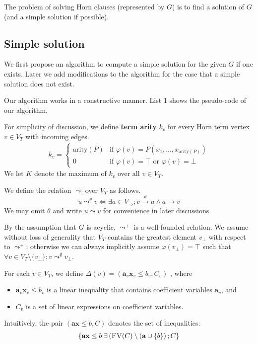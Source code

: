 \documentclass[a4paper,12pt]{article}
\newcommand{\edge}[2]{#1\rightarrow#2}
\newcommand{\edgel}[3]{#1\xrightarrow{#2}#3}
\begin{document}
The problem of solving Horn clauses (represented by $G$) is to find a
solution of $G$ (and a simple solution if possible).

\subsection{Simple solution}

We first propose an algorithm to compute a simple solution for the given
$G$ if one exists. Later we add modifications to the algorithm for the
case that a simple solution does not exist.

Our algorithm works in a constructive manner. List 1 shows the
pseudo-code of our algorithm.

For simplicity of discussion, we define \textbf{term arity} $k_v$ for
every Horn term vertex $v \in V_T$ with incoming edges.
\begin{align*}
k_v =
\begin{cases}
\mathrm{arity}(P) & \mbox{if } \varphi(v) = P(x_1,...,x_{\mathrm{arity}(P)}) \\
0 & \mbox{if } \varphi(v) = \top \mbox { or } \varphi(v) = \bot
\end{cases}
\end{align*}
We let $K$ denote the maximum of $k_v$ over all $v \in V_T$.

We define the relation $\leadsto$ over $V_T$ as follows.
\[ u \mathop{\leadsto}^\theta v \Longleftrightarrow
\exists a \in V_\Rightarrow; \edgel{v}{\theta}{a} \wedge \edge{a}{v} \]
We may omit $\theta$ and write $u \leadsto v$ for convenience in later
discussions.

By the assumption that $G$ is acyclic, $\leadsto^+$ is a well-founded
relation. We assume without loss of generality that $V_T$ contains the
greatest element $v_\bot$ with respect to $\leadsto^+$; otherwise we
can always implicitly assume $\varphi(v_\bot) = \top$ such that
$\forall v \in V_T \setminus \{v_\bot\}; v \mathop{\leadsto}^\emptyset v_\bot$.

For each $v \in V_T$, we define
$\Delta(v) = (\mathbf{a}_v \mathbf{x}_v \leq b_v, C_v)$
, where
\begin{itemize}
\item $\mathbf{a}_v \mathbf{x}_v \leq b_v$ is a linear inequality that
  contains coefficient variables $\mathbf{a}_v$, and
\item $C_v$ is a set of linear expressions on coefficient variables.
\end{itemize}
Intuitively, the pair $(\mathbf{a} \mathbf{x} \leq b, C)$ denotes the
set of inequalities:
\begin{align*}
\left\lbrace
 \mathbf{a} \mathbf{x} \leq b \middle|
 \exists \left( \textsc{FV}(C)
  \setminus (\mathbf{a} \cup \left\lbrace b \right\rbrace
 \right); C
\right\rbrace
\end{align*}
\end{document}
